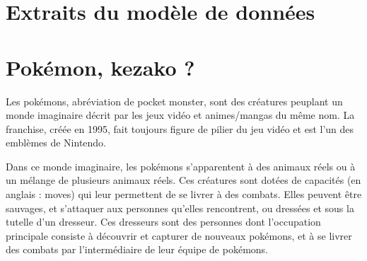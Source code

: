 \chapter{Extraits du modèle de données}
\label{chap:annexeA}
\hspace{0pt}
















\chapter{Pokémon, kezako ?}
\label{chap:annexeB}
\hspace{0pt}

Les pokémons, abréviation de pocket monster, sont des créatures peuplant un monde imaginaire décrit par les jeux vidéo et animes/mangas du même nom. La franchise, créée en 1995, fait toujours figure de pilier du jeu vidéo et est l'un des emblèmes de Nintendo.

Dans ce monde imaginaire, les pokémons s'apparentent à des animaux réels ou à un mélange de plusieurs animaux réels. Ces créatures sont dotées de capacités (en anglais : moves) qui leur permettent de se livrer à des combats. Elles peuvent être sauvages, et s’attaquer aux personnes qu’elles rencontrent, ou dressées et sous la tutelle d’un dresseur. Ces dresseurs sont des personnes dont l’occupation principale consiste à découvrir et capturer de nouveaux pokémons, et à se livrer des combats par l’intermédiaire de leur équipe de pokémons.

